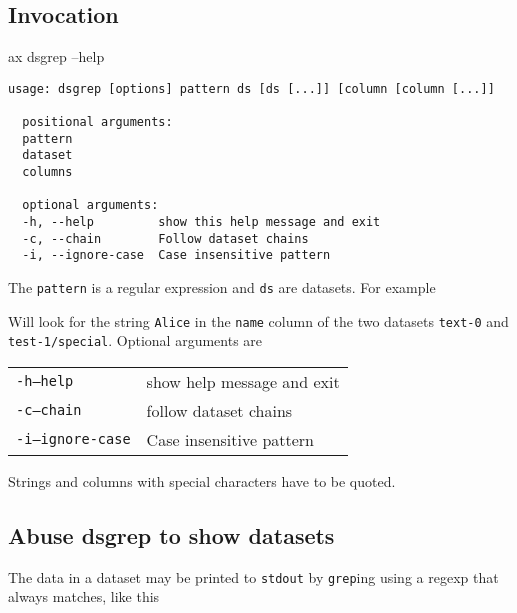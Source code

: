 \subsection{Invocation}
\begin{shell}
ax dsgrep --help
\end{shell}

\begin{snugshade}
\begin{verbatim}
usage: dsgrep [options] pattern ds [ds [...]] [column [column [...]]

  positional arguments:
  pattern
  dataset
  columns

  optional arguments:
  -h, --help         show this help message and exit
  -c, --chain        Follow dataset chains
  -i, --ignore-case  Case insensitive pattern
\end{verbatim}
\end{snugshade}

The \texttt{pattern} is a regular expression and \texttt{ds} are datasets.  For example
\begin{shell}
\end{shell}
Will look for the string \texttt{Alice} in the \texttt{name} column of
the two datasets \texttt{text-0} and \texttt{test-1/special}.
Optional arguments are
\begin{snugshade}
  \begin{tabular}{p{4cm}p{9cm}}
      \texttt{-h}\hspace{3cm}\texttt{--help} & show help message and exit\\[4ex]
      \texttt{-c}\hspace{3cm}\texttt{--chain} & follow dataset chains\\[4ex]
      \texttt{-i}\hspace{3cm}\texttt{--ignore-case} & Case insensitive pattern\\[4ex]
  \end{tabular}
\end{snugshade}
Strings and columns with special characters have to be quoted.



\subsection{Abuse dsgrep to show datasets}
The data in a dataset may be printed to \texttt{stdout} by
\texttt{grep}ing using a regexp that always matches, like this
\begin{shell}
\end{shell}





